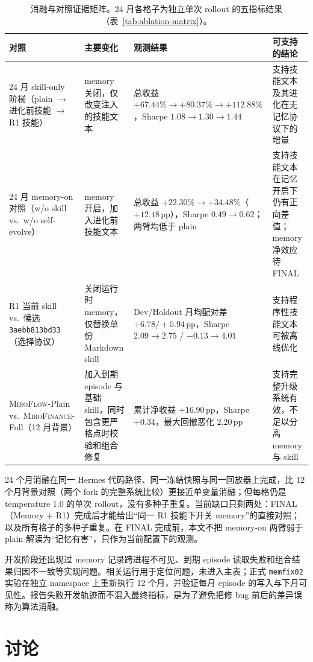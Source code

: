 \documentclass[11pt]{article}
\newcommand{\miroflow}{\textsc{MiroFlow}}
\newcommand{\memskill}{\textsc{MiroFinance}}
\newcommand{\pp}{\,\mathrm{pp}}
\begin{document}
\begin{table}[t]
\centering
\small
\begin{tabular}{@{}p{}p{}p{}p{}@{}}
\toprule
\textbf{对照} & \textbf{主要变化} & \textbf{观测结果} & \textbf{可支持的结论} \\
\midrule
24 月 skill-only 阶梯（plain $\to$ 进化前技能 $\to$ R1 技能） &
memory 关闭，仅改变注入的技能文本 &
总收益 $+67.44\%\to+80.37\%\to+112.88\%$，Sharpe $1.08\to1.30\to1.44$ &
支持技能文本及其进化在无记忆协议下的增量 \\
24 月 memory-on 对照（w/o skill vs.\ w/o self-evolve） &
memory 开启，加入进化前技能文本 &
总收益 $+22.30\%\to+34.48\%$（$+12.18\pp$），Sharpe $0.49\to0.62$；两臂均低于 plain &
支持技能文本在记忆开启下仍有正向差值；memory 净效应待 FINAL \\
R1 当前 skill vs.\ 候选 \texttt{3aebb813bd33}（选择协议） &
关闭运行时 memory，仅替换单份 Markdown skill &
Dev/Holdout 月均配对差 $+6.78/+5.94\pp$，Sharpe $2.09\!\to\!2.75$ / $-0.13\!\to\!4.01$ &
支持程序性技能文本可被离线优化 \\
\miroflow{}-Plain vs.\ \memskill{}-Full（12 月背景） &
加入到期 episode 与基础 skill，同时包含更严格点时校验和组合修复 &
累计净收益 $+16.90\pp$，Sharpe $+0.34$，最大回撤恶化 $2.20\pp$ &
支持完整升级系统有效，不足以分离 memory 与 skill \\
\bottomrule
\end{tabular}
\caption{消融与对照证据矩阵。24 月各格子为独立单次 rollout 的五指标结果（表~\ref{tab:ablation-matrix}）。}
\label{tab:ablation}
\end{table}

24 个月消融在同一 Hermes 代码路径、同一冻结快照与同一回放器上完成，比 12 个月背景对照（两个 fork 的完整系统比较）更接近单变量消融；但每格仍是 temperature 1.0 的单次 rollout，没有多种子重复。当前缺口只剩两处：FINAL（Memory + R1）完成后才能给出``同一 R1 技能下开关 memory''的直接对照；以及所有格子的多种子重复。在 FINAL 完成前，本文不把 memory-on 两臂弱于 plain 解读为``记忆有害''，只作为当前配置下的观测。

开发阶段还出现过 memory 记录跨进程不可见、到期 episode 读取失败和组合结果归因不一致等实现问题。相关运行用于定位问题，未进入主表；正式 \texttt{memfix02} 实验在独立 namespace 上重新执行 12 个月，并验证每月 episode 的写入与下月可见性。报告失败开发轨迹而不混入最终指标，是为了避免把修 bug 前后的差异误称为算法消融。

\section{讨论}
\label{sec:discussion}
\end{document}
